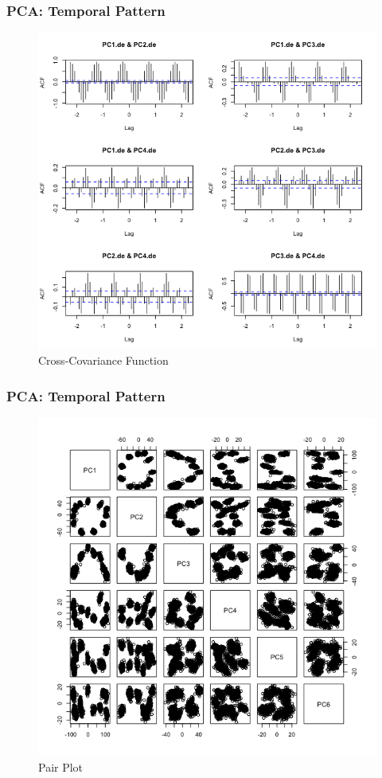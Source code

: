 \documentclass{beamer}
\begin{document}
\begin{frame}
\frametitle{PCA: Temporal Pattern}
\begin{figure}
\centering
\includegraphics[width=0.7\linewidth]{../img/PCAde_CCF}
\caption{Cross-Covariance Function}
\label{fig:pcadpeccf}
\end{figure}
\end{frame}

\begin{frame}
\frametitle{PCA: Temporal Pattern}
\begin{figure}
\centering
\includegraphics[width=0.7\linewidth]{../img/PCAde_pair}
\caption{Pair Plot}
\label{fig:pcade_pair}
\end{figure}
\end{frame}
\end{document}
